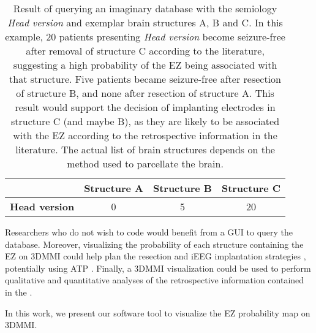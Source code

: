 \begin{table}
  \setlength{\tabcolsep}{3pt}
  \centering
  \caption[Result of querying an imaginary database with one semiology]{
    Result of querying an imaginary database with the semiology \textit{Head version} and exemplar brain structures A, B and C.
    In this example, 20 patients presenting \textit{Head version} become seizure-free after removal of structure C according to the literature, suggesting a high probability of the \ac{EZ} being associated with that structure.
    Five patients became seizure-free after resection of structure B, and none after resection of structure A.
    This result would support the decision of implanting electrodes in structure C (and maybe B), as they are likely to be associated with the \ac{EZ} according to the retrospective information in the literature.
    The actual list of brain structures depends on the method used to parcellate the brain.
  }
  \label{tab:single_semiology}
  \begin{tabular}{l*3c}
    \toprule
                          & \textbf{Structure A} & \textbf{Structure B} & \textbf{Structure C} \\
    \midrule
    \textbf{Head version} &                    0 &                    5 &                   20 \\
  \end{tabular}
\end{table}

Researchers who do not wish to code would benefit from a \ac{GUI} to query the database.
Moreover, visualizing the probability of each structure containing the \ac{EZ} on \ac{3DMMI} could help plan the resection and \ac{iEEG} implantation strategies \cite{nowell_resection_2017, nowell_utility_2015}, potentially using \ac{ATP} \cite{sparks_automated_2017}.
Finally, a \ac{3DMMI} visualization could be used to perform qualitative and quantitative analyses of the retrospective information contained in the \svtdatabase.

In this work, we present our software tool to visualize the \ac{EZ} probability map on \ac{3DMMI}.

